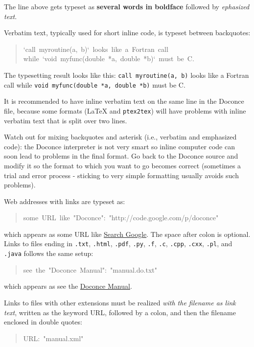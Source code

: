 \documentclass[a4paper]{article}
\begin{document}
The line above gets typeset as
\textbf{several words in boldface} followed by \emph{ephasized text}.

Verbatim text, typically used for short inline code,
is typeset between backquotes:
%
\begin{quote}{\ttfamily \raggedright \noindent
`call~myroutine(a,~b)`~looks~like~a~Fortran~call\\
while~`void~myfunc(double~*a,~double~*b)`~must~be~C.
}
\end{quote}

The typesetting result looks like this:
\texttt{call myroutine(a, b)} looks like a Fortran call
while \texttt{void myfunc(double *a, double *b)} must be C.

It is recommended to have inline verbatim text on the same line in
the Doconce file, because some formats (LaTeX and \texttt{ptex2tex}) will have
problems with inline verbatim text that is split over two lines.

Watch out for mixing backquotes and asterisk (i.e., verbatim and
emphasized code): the Doconce interpreter is not very smart so inline
computer code can soon lead to problems in the final format. Go back to the
Doconce source and modify it so the format to which you want to go
becomes correct (sometimes a trial and error process - sticking to
very simple formatting usually avoids such problems).

Web addresses with links are typeset as:
%
\begin{quote}{\ttfamily \raggedright \noindent
some~URL~like~"Doconce":~"http://code.google.com/p/doconce"
}
\end{quote}

which appears as some URL like \href{http://google.com}{Search Google}.
The space after colon is optional.
Links to files ending in \texttt{.txt}, \texttt{.html}, \texttt{.pdf}, \texttt{.py}, \texttt{.f},
\texttt{.c}, \texttt{.cpp}, \texttt{.cxx}, \texttt{.pl}, and \texttt{.java} follows the same
setup:
%
\begin{quote}{\ttfamily \raggedright \noindent
see~the~"Doconce~Manual":~"manual.do.txt"
}
\end{quote}

which appears as see the \href{manual.do.txt}{Doconce Manual}.

Links to files with other extensions must be realized
\emph{with the filename as link text}, written as
the keyword URL, followed by a colon, and then the filename enclosed
in double quotes:
%
\begin{quote}{\ttfamily \raggedright \noindent
URL:~"manual.xml"
}
\end{quote}
\end{document}
